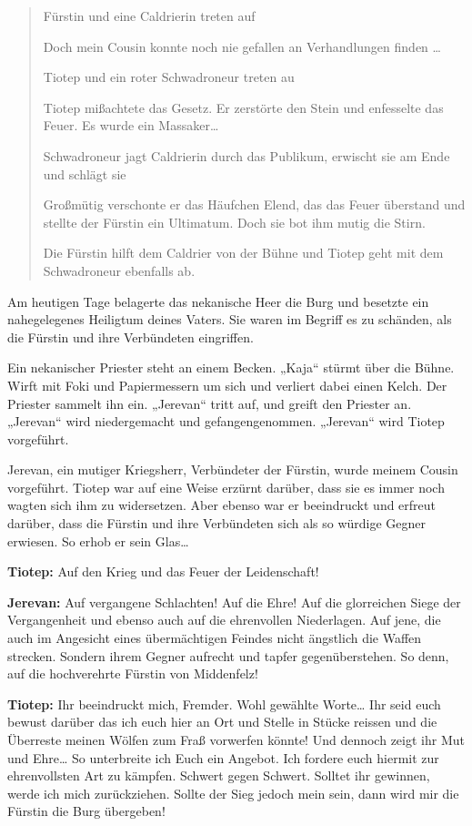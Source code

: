 \documentclass[a5paper,6pt]{book}
\begin{document}
\begin{quote}


Fürstin und eine Caldrierin treten auf

Doch mein Cousin konnte noch nie gefallen an Verhandlungen finden …

Tiotep und ein roter Schwadroneur treten au

Tiotep mißachtete das Gesetz. Er zerstörte den Stein und enfesselte das Feuer. Es
wurde ein Massaker…

Schwadroneur jagt Caldrierin durch das Publikum, erwischt sie am Ende und schlägt sie

Großmütig verschonte er das Häufchen Elend, das das Feuer überstand und stellte der
Fürstin ein Ultimatum. Doch sie bot ihm mutig die Stirn.

Die Fürstin hilft dem Caldrier von der Bühne und Tiotep geht mit dem Schwadroneur
ebenfalls ab.

\end{quote}

Am heutigen Tage belagerte das nekanische Heer die Burg und besetzte ein
nahegelegenes Heiligtum deines Vaters. Sie waren im Begriff es zu schänden, als die
Fürstin und ihre Verbündeten eingriffen.

Ein nekanischer Priester steht an einem Becken. „Kaja“ stürmt über die Bühne. Wirft mit
Foki und Papiermessern um sich und verliert dabei einen Kelch. Der Priester sammelt ihn
ein. „Jerevan“ tritt auf, und greift den Priester an. „Jerevan“ wird niedergemacht und
gefangengenommen. „Jerevan“ wird Tiotep vorgeführt.

Jerevan, ein mutiger Kriegsherr, Verbündeter der Fürstin, wurde meinem Cousin vorgeführt.
Tiotep war auf eine Weise erzürnt darüber, dass sie es immer noch wagten sich ihm zu
widersetzen. Aber ebenso war er beeindruckt und erfreut darüber, dass die Fürstin und
ihre Verbündeten sich als so würdige Gegner erwiesen. So erhob er sein Glas…

\textbf{Tiotep:} Auf den Krieg und das Feuer der Leidenschaft!

\textbf{Jerevan:} Auf vergangene Schlachten! Auf die Ehre! Auf die glorreichen Siege der
Vergangenheit und ebenso auch auf die ehrenvollen Niederlagen. Auf jene, die auch
im Angesicht eines übermächtigen Feindes nicht ängstlich die Waffen strecken.
Sondern ihrem Gegner aufrecht und tapfer gegenüberstehen. So denn, auf die
hochverehrte Fürstin von Middenfelz!

\textbf{Tiotep:} Ihr beeindruckt mich, Fremder. Wohl gewählte Worte… Ihr seid euch bewust darüber
das ich euch hier an Ort und Stelle in Stücke reissen und die Überreste meinen Wölfen
zum Fraß vorwerfen könnte! Und dennoch zeigt ihr Mut und Ehre… So unterbreite
ich Euch ein Angebot. Ich fordere euch hiermit zur ehrenvollsten Art zu kämpfen.
Schwert gegen Schwert. Solltet ihr gewinnen, werde ich mich zurückziehen. Sollte der
Sieg jedoch mein sein, dann wird mir die Fürstin die Burg übergeben!
\end{document}
